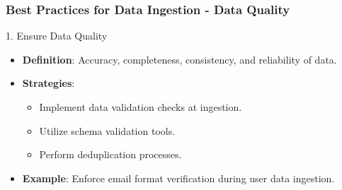\documentclass[aspectratio=169]{beamer}
\begin{document}
\begin{frame}[fragile]
    \frametitle{Best Practices for Data Ingestion - Data Quality}
    \begin{block}{1. Ensure Data Quality}
        \begin{itemize}
            \item \textbf{Definition}: Accuracy, completeness, consistency, and reliability of data.
            \item \textbf{Strategies}:
            \begin{itemize}
                \item Implement data validation checks at ingestion.
                \item Utilize schema validation tools.
                \item Perform deduplication processes.
            \end{itemize}
            \item \textbf{Example}: Enforce email format verification during user data ingestion.
        \end{itemize}
    \end{block}
\end{frame}
\end{document}
